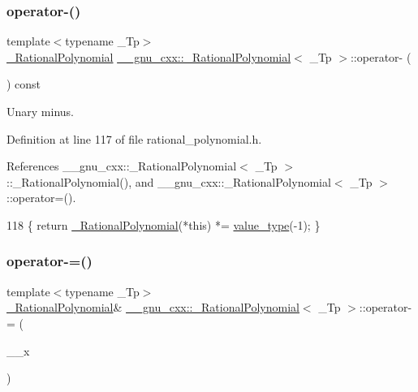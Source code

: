 \subsubsection{\texorpdfstring{operator-\/()}{operator-()}}
{\footnotesize\ttfamily template$<$typename \+\_\+\+Tp$>$ \\
\hyperlink{class____gnu__cxx_1_1__RationalPolynomial}{\+\_\+\+Rational\+Polynomial} \hyperlink{class____gnu__cxx_1_1__RationalPolynomial}{\+\_\+\+\_\+gnu\+\_\+cxx\+::\+\_\+\+Rational\+Polynomial}$<$ \+\_\+\+Tp $>$\+::operator-\/ (\begin{DoxyParamCaption}{ }\end{DoxyParamCaption}) const\hspace{0.3cm}{\ttfamily [inline]}}

Unary minus. 

Definition at line 117 of file rational\+\_\+polynomial.\+h.



References \+\_\+\+\_\+gnu\+\_\+cxx\+::\+\_\+\+Rational\+Polynomial$<$ \+\_\+\+Tp $>$\+::\+\_\+\+Rational\+Polynomial(), and \+\_\+\+\_\+gnu\+\_\+cxx\+::\+\_\+\+Rational\+Polynomial$<$ \+\_\+\+Tp $>$\+::operator=().


\begin{DoxyCode}
118       \{ \textcolor{keywordflow}{return} \hyperlink{class____gnu__cxx_1_1__RationalPolynomial_a35b2504272a73aa54b48310004c46fd1}{\_RationalPolynomial}(*\textcolor{keyword}{this}) *= \hyperlink{class____gnu__cxx_1_1__RationalPolynomial_adeec7f1bec03111031599f337848ee8b}{value\_type}(-1); \}
\end{DoxyCode}
\mbox{\label{class____gnu__cxx_1_1__RationalPolynomial_ad233308f7f97d2658486b5eae84f90a5}} 
\subsubsection{\texorpdfstring{operator-\/=()}{operator-=()}}
{\footnotesize\ttfamily template$<$typename \+\_\+\+Tp$>$ \\
\hyperlink{class____gnu__cxx_1_1__RationalPolynomial}{\+\_\+\+Rational\+Polynomial}\& \hyperlink{class____gnu__cxx_1_1__RationalPolynomial}{\+\_\+\+\_\+gnu\+\_\+cxx\+::\+\_\+\+Rational\+Polynomial}$<$ \+\_\+\+Tp $>$\+::operator-\/= (\begin{DoxyParamCaption}\item[{const \hyperlink{class____gnu__cxx_1_1__RationalPolynomial}{\+\_\+\+Rational\+Polynomial}$<$ \+\_\+\+Tp $>$ \&}]{\+\_\+\+\_\+x }\end{DoxyParamCaption})\hspace{0.3cm}{\ttfamily [inline]}}


